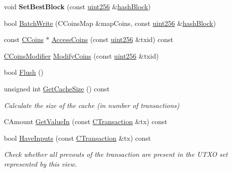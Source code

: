 \begin{DoxyCompactItemize}
\mbox{\label{class_c_coins_view_cache_aa3f787f77b123f0fd340fbe4e458b4ad}} 
void {\bfseries Set\+Best\+Block} (const \mbox{\hyperlink{classuint256}{uint256}} \&\mbox{\hyperlink{class_c_coins_view_cache_a229dddddbc5501edc250209a2ce5df8b}{hash\+Block}})
\item 
bool \mbox{\hyperlink{class_c_coins_view_cache_a561bb7c6c97701b12c48fbbb563d0a91}{Batch\+Write}} (C\+Coins\+Map \&map\+Coins, const \mbox{\hyperlink{classuint256}{uint256}} \&\mbox{\hyperlink{class_c_coins_view_cache_a229dddddbc5501edc250209a2ce5df8b}{hash\+Block}})
\item 
const \mbox{\hyperlink{class_c_coins}{C\+Coins}} $\ast$ \mbox{\hyperlink{class_c_coins_view_cache_a8e5341e8b01233949d6170dd4d1fd75d}{Access\+Coins}} (const \mbox{\hyperlink{classuint256}{uint256}} \&txid) const
\item 
\mbox{\hyperlink{class_c_coins_modifier}{C\+Coins\+Modifier}} \mbox{\hyperlink{class_c_coins_view_cache_ab67c0d489873ed735c4fc52aa66f0830}{Modify\+Coins}} (const \mbox{\hyperlink{classuint256}{uint256}} \&txid)
\item 
bool \mbox{\hyperlink{class_c_coins_view_cache_ac9888d4feaa46666d03871cd7cd1c01d}{Flush}} ()
\item 
\mbox{\label{class_c_coins_view_cache_a937e30d96fd43e403c862b193cf5b942}} 
unsigned int \mbox{\hyperlink{class_c_coins_view_cache_a937e30d96fd43e403c862b193cf5b942}{Get\+Cache\+Size}} () const
\begin{DoxyCompactList}\small\item\em Calculate the size of the cache (in number of transactions) \end{DoxyCompactList}\item 
C\+Amount \mbox{\hyperlink{class_c_coins_view_cache_a1a8cd6069fba96939ffcb1bd36ffb921}{Get\+Value\+In}} (const \mbox{\hyperlink{class_c_transaction}{C\+Transaction}} \&tx) const
\item 
\mbox{\label{class_c_coins_view_cache_a5b1abd71c95dc7be2523b9c28839ec29}} 
bool \mbox{\hyperlink{class_c_coins_view_cache_a5b1abd71c95dc7be2523b9c28839ec29}{Have\+Inputs}} (const \mbox{\hyperlink{class_c_transaction}{C\+Transaction}} \&tx) const
\begin{DoxyCompactList}\small\item\em Check whether all prevouts of the transaction are present in the U\+T\+XO set represented by this view. \end{DoxyCompactList}\item 

\end{DoxyCompactItemize}

